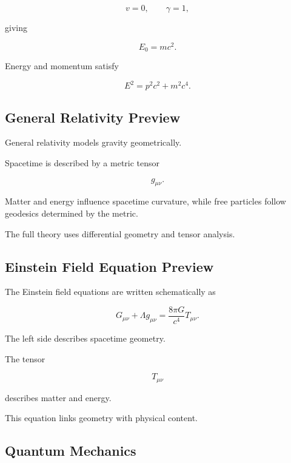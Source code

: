 \[
v=0,
\qquad
\gamma=1,
\]

giving

\[
\boxed{
E_0
=
mc^2.
}
\]

Energy and momentum satisfy

\[
\boxed{
E^2
=
p^2c^2
+
m^2c^4.
}
\]

\subsection{General Relativity Preview}
\label{subsec:general-relativity-preview}

General relativity models gravity geometrically.

Spacetime is described by a metric tensor

\[
\boxed{
g_{\mu\nu}.
}
\]

Matter and energy influence spacetime curvature, while free particles follow
geodesics determined by the metric.

The full theory uses differential geometry and tensor analysis.

\subsection{Einstein Field Equation Preview}
\label{subsec:einstein-field-equation-preview}

The Einstein field equations are written schematically as

\[
\boxed{
G_{\mu\nu}
+
\Lambda g_{\mu\nu}
=
\frac{8\pi G}{c^4}
T_{\mu\nu}.
}
\]

The left side describes spacetime geometry.

The tensor

\[
T_{\mu\nu}
\]

describes matter and energy.

This equation links geometry with physical content.

\subsection{Quantum Mechanics}
\label{subsec:quantum-mechanics-mathematical-physics}

